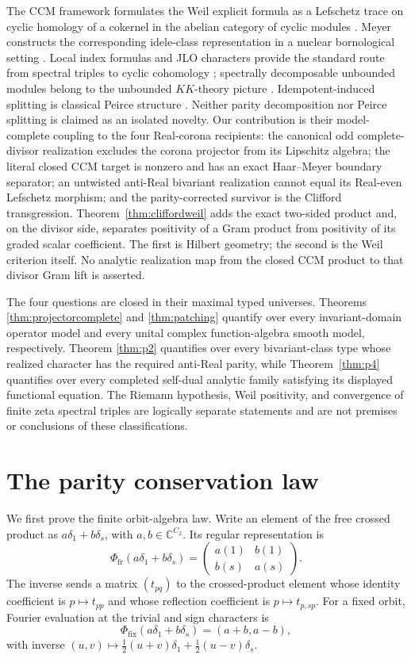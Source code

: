\documentclass[11pt,reqno]{amsart}
\newcommand{\C}{\mathbb C}
\begin{document}
The CCM framework formulates the Weil explicit formula as a Lefschetz trace on cyclic homology of
a cokernel in the abelian category of cyclic modules \cite{CCM}.  Meyer constructs the
corresponding idele-class representation in a nuclear bornological setting \cite{Meyer}.  Local
index formulas and JLO characters provide the standard route from spectral triples to cyclic
cohomology \cite{CM,JLO,Moscovici}; spectrally decomposable unbounded modules belong to the
unbounded $KK$-theory picture \cite{Kaad}.  Idempotent-induced splitting is classical Peirce
structure \cite{AnhBirkenmeierVanWyk}.  Neither parity decomposition nor Peirce splitting is
claimed as an isolated novelty.  Our contribution is their model-complete coupling to the four
Real-corona recipients: 
the canonical odd complete-divisor realization excludes the corona projector from its Lipschitz
algebra; the literal closed CCM target is nonzero and has an exact Haar--Meyer boundary separator;
an untwisted anti-Real bivariant realization cannot equal its Real-even Lefschetz morphism; and the
parity-corrected survivor is the Clifford transgression.
Theorem~\ref{thm:cliffordweil} adds the exact two-sided product and, on the divisor side, separates
positivity of a Gram product from positivity of its graded scalar coefficient.  The first is
Hilbert geometry; the second is the Weil criterion itself.  No analytic realization map from the
closed CCM product to that divisor Gram lift is asserted.

The four questions are closed in their maximal typed universes.  Theorems
\ref{thm:projectorcomplete} and \ref{thm:patching} quantify over every invariant-domain operator
model and every unital complex function-algebra smooth model, respectively.  Theorem
\ref{thm:p2} quantifies over every bivariant-class type whose realized character has the required
anti-Real parity, while Theorem~\ref{thm:p4} quantifies over every completed self-dual analytic
family satisfying its displayed functional equation.  The Riemann hypothesis, Weil positivity,
and convergence of finite zeta spectral triples are logically separate statements and are not
premises or conclusions of these classifications.

\section{The parity conservation law}\label{sec:law}

We first prove the finite orbit-algebra law.  Write an element of the free crossed product as
$a\delta_1+b\delta_s$, with $a,b\in\C^{C_2}$.  Its regular representation is
\[
 \Phi_{\mathrm{fr}}(a\delta_1+b\delta_s)
   =\begin{pmatrix}a(1)&b(1)\\ b(s)&a(s)\end{pmatrix}.             \tag{2.1}
\]
The inverse sends a matrix $(t_{pq})$ to the crossed-product element whose identity coefficient
is $p\mapsto t_{pp}$ and whose reflection coefficient is $p\mapsto t_{p,sp}$.  For a fixed
orbit, Fourier evaluation at the trivial and sign characters is
\[
             \Phi_{\mathrm{fix}}(a\delta_1+b\delta_s)=(a+b,a-b),   \tag{2.2}
\]
with inverse $(u,v)\mapsto \frac12(u+v)\delta_1+\frac12(u-v)\delta_s$.
\end{document}
